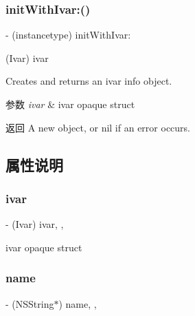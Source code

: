 \subsubsection{\texorpdfstring{init\+With\+Ivar\+:()}{initWithIvar:()}}
{\footnotesize\ttfamily -\/ (instancetype) init\+With\+Ivar\+: \begin{DoxyParamCaption}\item[{(Ivar)}]{ivar }\end{DoxyParamCaption}}

Creates and returns an ivar info object.


\begin{DoxyParams}{参数}
{\em ivar} & ivar opaque struct \\
\hline
\end{DoxyParams}
\begin{DoxyReturn}{返回}
A new object, or nil if an error occurs. 
\end{DoxyReturn}


\subsection{属性说明}
\mbox{\label{interface_m_a_r_class_ivar_info_ad031431aecc2ca5dee53fbf9e23579ad}} 
\subsubsection{\texorpdfstring{ivar}{ivar}}
{\footnotesize\ttfamily -\/ (Ivar) ivar\hspace{0.3cm}{\ttfamily [read]}, {\ttfamily [nonatomic]}, {\ttfamily [assign]}}



ivar opaque struct 

\mbox{\label{interface_m_a_r_class_ivar_info_a46f18b089d378603112075f99780ac57}} 
\subsubsection{\texorpdfstring{name}{name}}
{\footnotesize\ttfamily -\/ (N\+S\+String$\ast$) name\hspace{0.3cm}{\ttfamily [read]}, {\ttfamily [nonatomic]}, {\ttfamily [strong]}}



